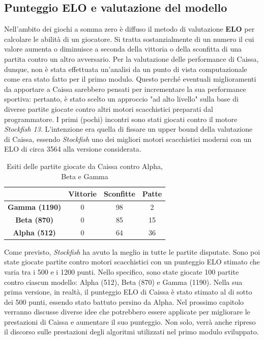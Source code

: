 \subsection{Punteggio ELO e valutazione del modello}
Nell'ambito dei giochi a somma zero è diffuso il metodo di valutazione \textbf{ELO} per calcolare le abilità di un giocatore. Si tratta sostanzialmente di un numero il cui valore aumenta o diminuisce a seconda della vittoria o della sconfitta di una partita contro un altro avversario.
Per la valutazione delle performance di Caissa, dunque, non è stata effettuata un'analisi da un punto di vista computazionale come era stato fatto per il primo modulo. Questo perché eventuali miglioramenti da apportare a Caissa sarebbero pensati per incrementare la sua performance sportiva: pertanto, è stato scelto un approccio "ad alto livello" sulla base di diverse partite giocate contro altri motori scacchistici preparati dal programmatore. I primi (pochi) incontri sono stati giocati contro il motore \textit{Stockfish 13}. L'intenzione era quella di fissare un upper bound della valutazione di Caissa, essendo \textit{Stockfish} uno dei migliori motori scacchistici moderni con un ELO di circa 3564 alla versione considerata\cite{robinson2021teaching}. \newpage


\begin{table}[!htb]
    \centering
    \begin{tabular}{|c|c|c|c|}
\hline
\textbf{} & \textbf{Vittorie} & \textbf{Sconfitte} & \textbf{Patte}\\
\hline
\textbf{Gamma (1190)} & 0 & 98 & 2\\
\hline
\textbf{Beta (870)} & 0 & 85 & 15\\
\hline
\textbf{Alpha (512)} & 0 & 64 & 36\\
\hline
\end{tabular}
    \caption{Esiti delle partite giocate da Caissa contro Alpha, Beta e Gamma}
    \label{tab:my_label}
\end{table}
Come previsto, \textit{Stockfish} ha avuto la meglio in tutte le partite disputate. Sono poi state giocate partite contro motori scacchistici con un punteggio ELO stimato che varia tra i 500 e i 1200 punti. Nello specifico, sono state giocate 100 partite contro ciascun modello: Alpha (512), Beta (870) e Gamma (1190). Nella sua prima versione, in realtà, il punteggio ELO di Caissa è stato stimato al di sotto dei 500 punti, essendo stato battuto persino da Alpha.
Nel prossimo capitolo verranno discusse diverse idee che potrebbero essere applicate per migliorare le prestazioni di Caissa e aumentare il suo punteggio. Non solo, verrà anche ripreso il discorso sulle prestazioni degli algoritmi utilizzati nel primo modulo sviluppato.


\newpage
